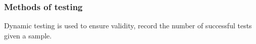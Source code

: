 \documentclass[12pt]{article}
\begin{document}

\subsubsection{Methods of testing}
Dynamic testing is used to ensure validity, record the number of successful tests given a sample.
\end{document}
